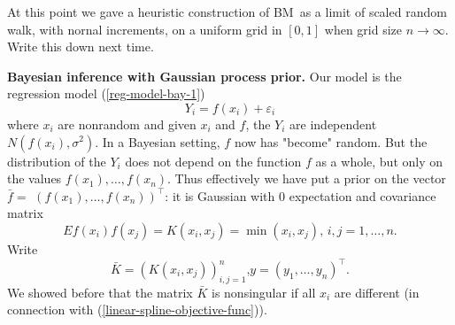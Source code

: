 \documentclass[11pt,twoside]{article}%
\theoremstyle{change}
\newenvironment{quote-env}{\begin{quote}\sffamily }{\end{quote}}
\newenvironment{mycomments-env}[1][Mycomments]{\textbf{#1.} \begin{quote-env} }{ \end{quote-env}  \ \rule{0.5em}{0.5em}}
\begin{document}
\begin{mycomments}%


\begin{mycomments-env}
At this point we gave a heuristic construction of BM\ as a limit of scaled
random walk, with nornal increments, on a uniform grid in $[0,1]$ when grid
size $n\rightarrow\infty$. Write this down next time.
\end{mycomments-env}%

\end{mycomments}%


\textbf{Bayesian inference with Gaussian process prior.} Our model is the
regression model (\ref{reg-model-bay-1})%
\[
Y_{i}=f(x_{i})+\varepsilon_{i}%
\]
where $x_{i}$ are nonrandom and given $x_{i}$ and $f$, the $Y_{i}$ are
independent $N(f(x_{i}),\sigma^{2})$. In a Bayesian setting, $f$ now has
"become" random. But the distribution of the $Y_{i}$ does not depend on the
function $f$ as a whole, but only on the values $f(x_{1}),\ldots,f(x_{n})$.
Thus effectively we have put a prior on the vector $\bar{f}=$ $\left(
f(x_{1}),\ldots,f(x_{n})\right)  ^{\top}$: it is Gaussian with $0$ expectation
and covariance matrix
\[
Ef(x_{i})f(x_{j})=K\left(  x_{i},x_{j}\right)  =\min\left(  x_{i}%
,x_{j}\right)  \text{, }i,j=1,\ldots,n.
\]
Write%
\[
\bar{K}=\left(  K\left(  x_{i},x_{j}\right)  \right)  _{i,j=1}^{n}\text{,
}y=\left(  y_{1},\ldots,y_{n}\right)  ^{\top}.
\]
We showed before that the matrix $\bar{K}$ is nonsingular if all $x_{i}$ are
different (in connection with (\ref{linear-spline-objective-func})).
\end{document}
